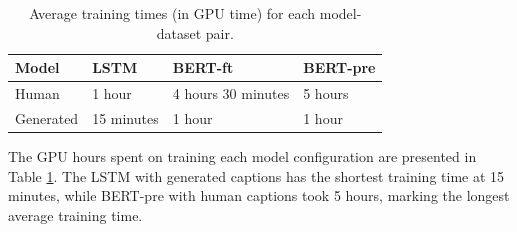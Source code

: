 


\begin{table}[h]
\centering
\begin{tabular}{l||l|l|l}

Model     & LSTM       & BERT-ft            & BERT-pre \\ \hline
Human     & 1 hour     & 4 hours 30 minutes & 5 hours  \\ \hline 
Generated & 15 minutes & 1 hour             & 1 hour  
\end{tabular}
\caption{Average training times (in GPU time) for each model-dataset pair.}
\label{tab:gpu-hours}
\end{table}

The GPU hours spent on training each model configuration are presented in Table \ref{tab:gpu-hours}. The LSTM with generated captions has the shortest training time at 15 minutes, while BERT-pre with human captions took 5 hours, marking the longest average training time.




